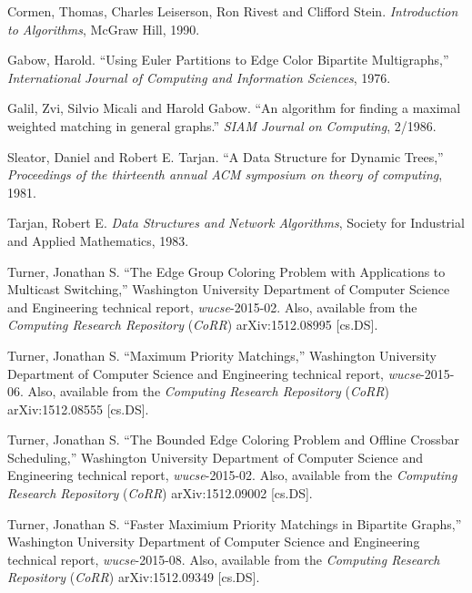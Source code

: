 \documentclass[11pt]{article}
\begin{document}
\begin{thebibliography}{99}

Cormen, Thomas, Charles Leiserson, Ron Rivest and Clifford Stein.
{\sl Introduction to Algorithms}, McGraw Hill, 1990.

Gabow, Harold. ``Using Euler Partitions to Edge Color Bipartite Multigraphs,''
{\sl International Journal of Computing and Information Sciences}, 1976.

Galil, Zvi, Silvio Micali and Harold Gabow.
``An  algorithm for finding a maximal weighted matching in general graphs.''
{\sl SIAM Journal on Computing}, 2/1986.

Sleator, Daniel and Robert E. Tarjan. ``A Data Structure for Dynamic Trees,'' 
{\sl Proceedings of the thirteenth annual ACM symposium on theory of computing}, 1981.

Tarjan, Robert E.
{\sl Data Structures and Network Algorithms},
Society for Industrial and Applied Mathematics, 1983.

Turner, Jonathan S.
``The Edge Group Coloring Problem with Applications to Multicast Switching,''
Washington University Department of Computer Science and Engineering technical report,
{\sl wucse}-2015-02. Also, available from the {\sl Computing Research Repository} ({\sl CoRR})
arXiv:1512.08995 [cs.DS].

Turner, Jonathan S.
``Maximum Priority Matchings,''
Washington University Department of Computer Science and Engineering technical report,
{\sl wucse}-2015-06. Also, available from the {\sl Computing Research Repository} ({\sl CoRR})
arXiv:1512.08555 [cs.DS].

Turner, Jonathan S.
``The Bounded Edge Coloring Problem and Offline Crossbar Scheduling,''
Washington University Department of Computer Science and Engineering technical report,
{\sl wucse}-2015-02. Also, available from the {\sl Computing Research Repository} ({\sl CoRR})
arXiv:1512.09002 [cs.DS].

Turner, Jonathan S.
``Faster Maximium Priority Matchings in Bipartite Graphs,''
Washington University Department of Computer Science and Engineering technical report,
{\sl wucse}-2015-08. Also, available from the {\sl Computing Research Repository} ({\sl CoRR})
arXiv:1512.09349 [cs.DS].
\end{thebibliography}
 
\end{document}
